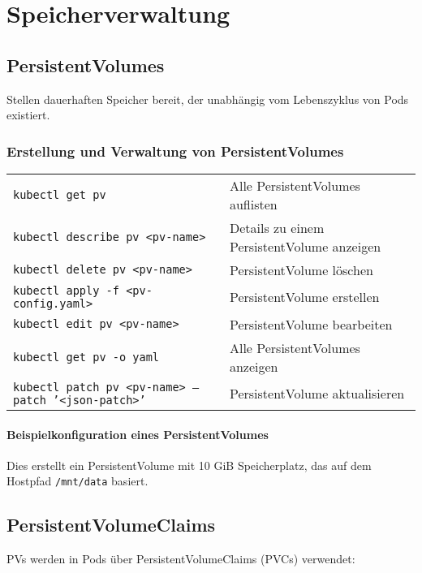 \chapter{Speicherverwaltung}

\section{PersistentVolumes}
Stellen dauerhaften Speicher bereit, der unabhängig vom Lebenszyklus von Pods existiert. \\
\subsection{Erstellung und Verwaltung von PersistentVolumes}
\noindent
\begin{tabular}{|p{}|p{}|}
\hline
\texttt{kubectl get pv} & Alle PersistentVolumes auflisten \\
\texttt{kubectl describe pv <pv-name>} & Details zu einem PersistentVolume anzeigen \\
\texttt{kubectl delete pv <pv-name>} & PersistentVolume löschen \\
\texttt{kubectl apply -f <pv-config.yaml>} & PersistentVolume erstellen \\
\texttt{kubectl edit pv <pv-name>} & PersistentVolume bearbeiten \\
\texttt{kubectl get pv -o yaml} & Alle PersistentVolumes anzeigen \\
\texttt{kubectl patch pv <pv-name> --patch '<json-patch>'} & PersistentVolume aktualisieren \\
\hline
\end{tabular}
\subsubsection{Beispielkonfiguration eines PersistentVolumes}


Dies erstellt ein PersistentVolume mit 10 GiB Speicherplatz, das auf dem Hostpfad \texttt{/mnt/data} basiert.
\section{PersistentVolumeClaims}
PVs werden in Pods über PersistentVolumeClaims (PVCs) verwendet:

